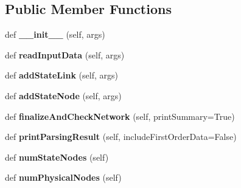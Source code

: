 \subsection*{Public Member Functions}
\begin{DoxyCompactItemize}
\item 
\mbox{\label{classdsmacc_1_1graph_1_1infomap_1_1MemNetwork_a81ffe278dfa2371cdd22a161af0ee9b3}} 
def {\bfseries \+\_\+\+\_\+init\+\_\+\+\_\+} (self, args)
\item 
\mbox{\label{classdsmacc_1_1graph_1_1infomap_1_1MemNetwork_a8e7be68e2e51917a1801a4e12fe368ee}} 
def {\bfseries read\+Input\+Data} (self, args)
\item 
\mbox{\label{classdsmacc_1_1graph_1_1infomap_1_1MemNetwork_a4ee48d96a16470332653e0be0996b27f}} 
def {\bfseries add\+State\+Link} (self, args)
\item 
\mbox{\label{classdsmacc_1_1graph_1_1infomap_1_1MemNetwork_a57b24649eb6e671723c16ba51716d3fb}} 
def {\bfseries add\+State\+Node} (self, args)
\item 
\mbox{\label{classdsmacc_1_1graph_1_1infomap_1_1MemNetwork_ae01f9628d1a2a2117937d4fc3b32e29e}} 
def {\bfseries finalize\+And\+Check\+Network} (self, print\+Summary=True)
\item 
\mbox{\label{classdsmacc_1_1graph_1_1infomap_1_1MemNetwork_a1629cda9e4609ba9b3c474d7017190fc}} 
def {\bfseries print\+Parsing\+Result} (self, include\+First\+Order\+Data=False)
\item 
\mbox{\label{classdsmacc_1_1graph_1_1infomap_1_1MemNetwork_a28ad8e9e3f73bf5023428aa7e3513260}} 
def {\bfseries num\+State\+Nodes} (self)
\item 
\mbox{\label{classdsmacc_1_1graph_1_1infomap_1_1MemNetwork_a9fca801ad69839c527588a57154adf99}} 
def {\bfseries num\+Physical\+Nodes} (self)
\item 

\end{DoxyCompactItemize}
